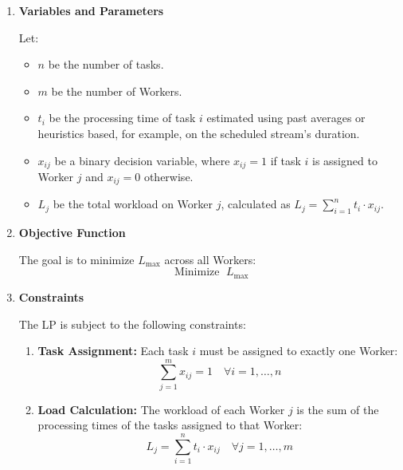 \begin{enumerate}
    \item \textbf{Variables and Parameters}

Let:
\begin{itemize}
    \item \( n \) be the number of tasks.
    \item \( m \) be the number of Workers.
    \item \( t_i \) be the processing time of task \( i \) estimated using past averages or heuristics based, for example, on the scheduled stream's duration.
    \item \( x_{ij} \) be a binary decision variable, where \( x_{ij} = 1 \) if task \( i \) is assigned to Worker \( j \) and \( x_{ij} = 0 \) otherwise.
    \item \( L_j \) be the total workload on Worker \( j \), calculated as \( L_j = \sum_{i=1}^{n} t_i \cdot x_{ij} \).
\end{itemize}

\item \textbf{Objective Function}

The goal is to minimize \( L_{\mathrm{max}} \) across all Workers:
\begin{equation}
\operatorname{Minimize\ } L_{\text{max}}
\end{equation}

\item \textbf{Constraints}

The \ac{LP} is subject to the following constraints:

\begin{enumerate}
    \item \textbf{Task Assignment:} Each task \( i \) must be assigned to exactly one Worker:
    \begin{equation}
    \sum_{j=1}^{m} x_{ij} = 1 \quad \forall i = 1, \dots, n
    \end{equation}

    \item \textbf{Load Calculation:} The workload of each Worker \( j \) is the sum of the processing times of the tasks assigned to that Worker:
    \begin{equation}
    L_j = \sum_{i=1}^{n} t_i \cdot x_{ij} \quad \forall j = 1, \dots, m
    \end{equation}


\end{enumerate}
\end{enumerate}
